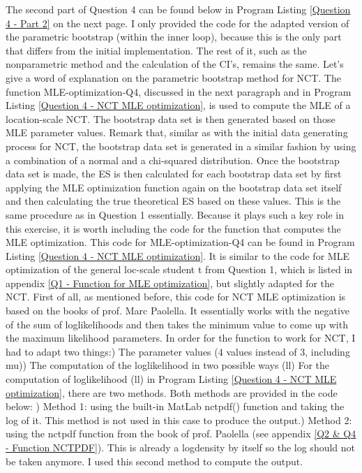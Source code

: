 \documentclass[12pt]{article}
\begin{document}
The second part of Question 4 can be found below in Program Listing \ref{Question 4 - Part 2} on the next page. I only provided the code for the adapted version of the parametric bootstrap (within the inner loop), because this is the only part that differs from the initial implementation. The rest of it, such as the nonparametric method and the calculation of the CI's, remains the same. Let's give a word of explanation on the parametric bootstrap method for NCT.\newline \newline 
The function MLE-optimization-Q4, discussed in the next paragraph and in Program Listing \ref{Question 4 - NCT MLE optimization}, is used to compute the MLE of a location-scale NCT.
The bootstrap data set is then generated based on those MLE parameter values. Remark that, similar as with the initial data generating process for NCT, the bootstrap data set is generated in a similar fashion by using a combination of a normal and a chi-squared distribution. Once the bootstrap data set is made, the ES is then calculated for each bootstrap data set by first applying the MLE optimization function again on the bootstrap data set itself and then calculating the true theoretical ES based on these values. This is the same procedure as in Question 1 essentially.\newline \newline
Because it plays such a key role in this exercise, it is worth including the code for the function that computes the MLE optimization. This code for MLE-optimization-Q4 can be found in Program Listing \ref{Question 4 - NCT MLE optimization}. It is similar to the code for MLE optimization of the general loc-scale student t from Question 1, which is listed in appendix \ref{Q1 - Function for MLE optimization}, but slightly adapted for the NCT. \newline First of all, as mentioned before, this code for NCT MLE optimization is based on the books of prof. Marc Paolella. It essentially works with the negative of the sum of loglikelihoods and then takes the minimum value to come up with the maximum likelihood parameters. In order for the function to work for NCT, I had to adapt two things:) The parameter values (4 values instead of 3, including mu)) The computation of the loglikelihood in two possible ways (ll)\newline\newline
For the computation of loglikelihood (ll) in Program Listing \ref{Question 4 - NCT MLE optimization}, there are two methods. Both methods are provided in the code below: ) Method 1: using the built-in MatLab nctpdf() function and taking the log of it. This method is not used in this case to produce the output.) Method 2: using the nctpdf function from the book of prof. Paolella (see appendix \ref{Q2 & Q4 - Function NCTPDF}). This is already a logdensity by itself so the log should not be taken anymore. I used this second method to compute the output.
\newpage
\end{document}
